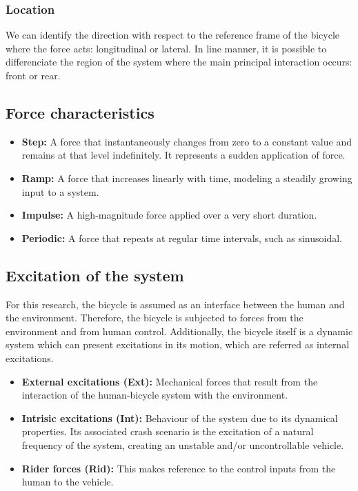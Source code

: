 \documentclass{article}
\begin{document}
\subsubsection{Location}

We can identify the direction with respect to the reference frame of the bicycle where the force acts: longitudinal or lateral.
%
In line manner, it is possible to differenciate the region of the system where the main principal interaction occurs: front or rear.

\subsection{Force characteristics}

\begin{itemize}
    \item \textbf{Step:} A force that instantaneously changes from zero to a constant value and remains at that level indefinitely. It represents a sudden application of force.
    \item \textbf{Ramp:} A force that increases linearly with time, modeling a steadily growing input to a system.
    \item \textbf{Impulse:} A high-magnitude force applied over a very short duration.
    \item \textbf{Periodic:} A force that repeats at regular time intervals, such as sinusoidal.
\end{itemize}

\subsection{Excitation of the system}

For this research, the bicycle is assumed as an interface between the human and the environment.
%
Therefore, the bicycle is subjected to forces from the environment and from human control.
%
Additionally, the bicycle itself is a dynamic system which can present excitations in its motion, which are referred as internal excitations.


\begin{itemize}
    \item \textbf{External excitations (Ext):} Mechanical forces that result from the interaction of the human-bicycle system with the environment.
    \item \textbf{Intrisic excitations (Int):} Behaviour of the system due to its dynamical properties.
        Its associated crash scenario is the excitation of a natural frequency of the system, creating an unstable and/or uncontrollable vehicle.
    \item \textbf{Rider forces (Rid):} This makes reference to the control inputs from the human to the vehicle.
\end{itemize}
\end{document}
